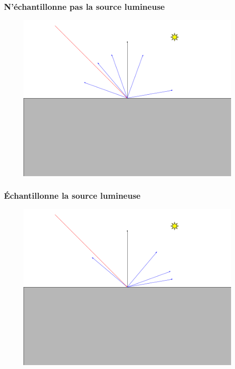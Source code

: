 \documentclass[handout]{beamer}
\begin{document}
\begin{frame}
    \frametitle{N'échantillonne pas la source lumineuse}
    \begin{figure}
        \includegraphics[scale=0.3]{Priority1.png}
    \end{figure}
\end{frame}

\begin{frame}
    \frametitle{Échantillonne la source lumineuse}
    \begin{figure}
        \includegraphics[scale=0.3]{Priority2.png}
    \end{figure}
\end{frame}
\end{document}

